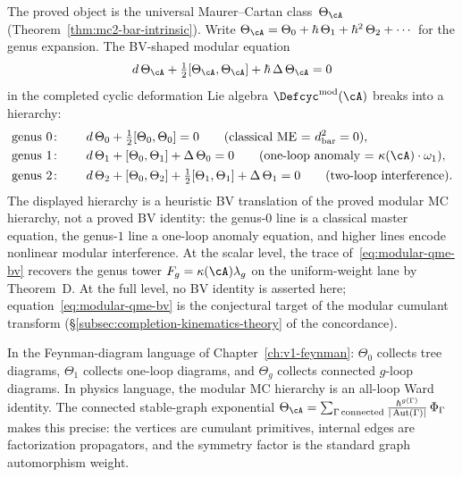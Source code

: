 \begin{remark}
\label{rem:modular-qme-bv}

The proved object is the universal Maurer--Cartan class~$\Theta_\cA$
\textup{(}Theorem~\ref{thm:mc2-bar-intrinsic}\textup{)}.
Write $\Theta_\cA = \Theta_0 + \hbar\,\Theta_1 + \hbar^2\,\Theta_2
+ \cdots$ for the genus expansion. The BV-shaped modular equation
\begin{equation}\label{eq:modular-qme-bv}
d\,\Theta_\cA + \tfrac{1}{2}[\Theta_\cA, \Theta_\cA]
+ \hbar\,\Delta\,\Theta_\cA = 0
\end{equation}
in the completed cyclic deformation Lie algebra
$\Defcyc^{\mathrm{mod}}(\cA)$ breaks into a hierarchy:
\begin{alignat*}{2}
&\text{genus } 0\colon\quad
 &&d\,\Theta_0 + \tfrac{1}{2}[\Theta_0,\Theta_0] = 0
 \qquad\text{(classical ME $=$ $d_{\mathrm{bar}}^2 = 0$)}, \\
&\text{genus } 1\colon\quad
 &&d\,\Theta_1 + [\Theta_0,\Theta_1] + \Delta\,\Theta_0 = 0
 \qquad\text{(one-loop anomaly $=$ $\kappa(\cA)\cdot\omega_1$)}, \\
&\text{genus } 2\colon\quad
 &&d\,\Theta_2 + [\Theta_0,\Theta_2]
 + \tfrac{1}{2}[\Theta_1,\Theta_1]
 + \Delta\,\Theta_1 = 0
 \qquad\text{(two-loop interference)}.
\end{alignat*}
The displayed hierarchy is a heuristic BV translation of the proved
modular MC hierarchy, not a proved BV identity: the
genus-$0$ line is a classical master equation, the genus-$1$
line a one-loop anomaly equation, and higher lines encode
nonlinear modular interference. At the scalar level, the trace
of~\eqref{eq:modular-qme-bv} recovers the genus tower
$F_g = \kappa(\cA)\lambda_g$ on the uniform-weight lane by
Theorem~D. At the
full level, no BV identity is asserted here; equation~\eqref{eq:modular-qme-bv}
is the conjectural target of the modular cumulant transform
(\S\ref{subsec:completion-kinematics-theory} of the concordance).

In the Feynman-diagram language of
Chapter~\ref{ch:v1-feynman}: $\Theta_0$ collects tree
diagrams, $\Theta_1$ collects one-loop diagrams, and $\Theta_g$
collects connected $g$-loop diagrams. In physics language, the modular MC hierarchy is an all-loop Ward identity. The connected
stable-graph exponential
$\Theta_\cA = \sum_{\Gamma\,\text{connected}}
\frac{\hbar^{g(\Gamma)}}{|\operatorname{Aut}(\Gamma)|}\,\Phi_\Gamma$
makes this precise: the vertices are cumulant primitives, internal
edges are factorization propagators, and the symmetry factor is the
standard graph automorphism weight.
\end{remark}

